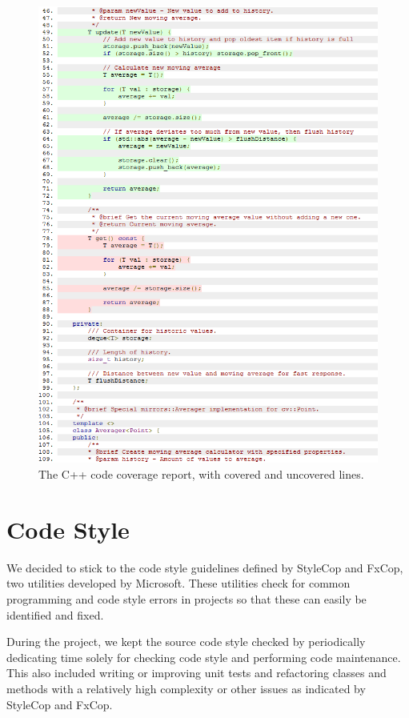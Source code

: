             \begin{figure}[!ht]
                \centering
                \includegraphics[scale = 0.5]{CPPCoverageLines}
                \caption{The C++ code coverage report, with covered and uncovered lines.}
                \label{fig:cpplines}
            \end{figure}
			
	\section{Code Style} \label{sec:codestyle}
		We decided to stick to the code style guidelines defined by StyleCop and 
		FxCop, two utilities developed by Microsoft. These utilities check for 
		common programming and code style errors in projects so that these can 
		easily be identified and fixed. 
		
		During the project, we kept the source code style checked by periodically
		dedicating time solely for checking code style and performing code 
		maintenance. This also included writing or improving unit tests and 
		refactoring classes and methods with a relatively high complexity or other 
		issues as indicated by StyleCop and FxCop.
		
